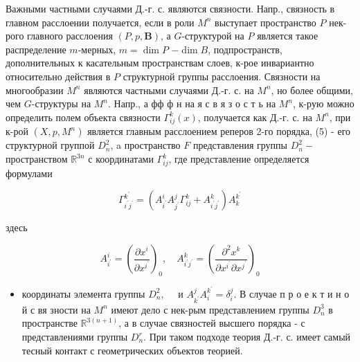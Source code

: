 \documentclass[10pt]{article}
\begin{document}
Важными частными случаями Д.-г. с. являются связности. Напр., связность в главном расслоении получается, если в роли $M^{n}$ выступает пространство $P$ нек-рого главного расслоения $(P, p, \boldsymbol{B})$, а $G$-структурой на $P$ является такое распределение $m$-мерных, $m=\operatorname{dim} P$ $-\operatorname{dim} B$, подпространств, дополнительных к касательным пространствам слоев, к-рое инвариантно относительно действия в $P$ структурной группы расслоения. Связности на многообразии $M^{n}$ являются частными случаями Д.-г. с. на $M^{n}$, но более общими, чем $G$-структуры на $M^{n}$. Напр., а фф ф н на я с в я з о с т ь на $M^{n}$, к-рую можно определить полем объекта связности $\Gamma_{i j}^{k}(x)$, получается как Д.-г. с. на $M^{n}$, при к-рой $\left(X, p, M^{n}\right)$ является главным расслоением реперов 2-го порядка, (5) - его структурной группой $D_{n}^{2}$, a пространство $F$ представления группы $D_{n}^{2}-$ пространством $\mathbb{R}^{3 n}$ с координатами $\Gamma_{i j}^{k}$, где представление определяется формулами



\[

\Gamma_{i^{\prime} j^{\prime}}^{k^{\prime}}=\left(A_{i^{\prime}}^{i} A_{j^{\prime}}^{j} \Gamma_{i j}^{k}+A_{i^{\prime} j^{\prime}}^{k}\right) A_{k}^{k^{\prime}}

\]



здесь



\[

A_{i^{\prime}}^{i}=\left(\frac{\partial x^{i}}{\partial x^{i^{\prime}}}\right)_{0}, \quad A_{i^{\prime} j^{\prime}}^{k}=\left(\frac{\partial^{2} x^{k}}{\partial x^{i^{\prime}} \partial x^{j^{\prime}}}\right)_{0}

\]



\begin{itemize}

  \item координаты элемента группы $D_{n}^{2}, \quad$ и $A_{k^{\prime}}^{j} A_{i}^{k^{\prime}}=\delta_{i}^{j}$. В случае п р о е к т и н о й с вя зности на $M^{n}$ имеют дело с нек-рым представлением группы $D_{n}^{3}$ в пространстве $\mathbb{R}^{3(n+1)}$, а в случае связностей высшего порядка - с представлениями группы $D_{n}^{r}$. При таком подходе теория Д.-г. с. имеет самый тесный контакт с геометрических объектов теорией.

\end{itemize}
\end{document}
